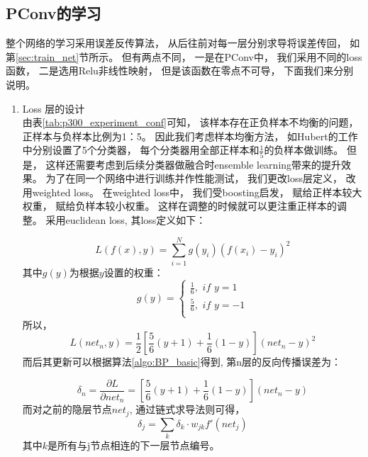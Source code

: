 \subsection{PConv的学习}\label{sec:weighted_loss}
整个网络的学习采用误差反传算法， 从后往前对每一层分别求导将误差传回， 如第\ref{sec:train_net}节所示。 但有两点不同， 一是在PConv中， 我们采用不同的loss函数， 二是选用Relu非线性映射， 但是该函数在零点不可导， 下面我们来分别说明。 
\begin{enumerate}
	\item Loss 层的设计\\
		由表\ref{tab:p300_experiment_conf}可知， 该样本存在正负样本不均衡的问题， 正样本与负样本比例为1：5。 因此我们考虑样本均衡方法， 如Hubert的工作中分别设置了5个分类器， 每个分类器用全部正样本和$\frac{1}{5}$的负样本做训练。 但是， 这样还需要考虑到后续分类器做融合时ensemble learning带来的提升效果。 为了在同一个网络中进行训练并作性能测试， 我们更改loss层定义， 改用weighted loss。 
		在weighted loss中， 我们受boosting启发\cite{}， 赋给正样本较大权重， 赋给负样本较小权重。 这样在调整的时候就可以更注重正样本的调整。 采用euclidean loss, 其loss定义如下：

\begin{equation}
	L(f(x),y) = \sum_{i=1}^N {g(y_i)(f(x_i) - y_i)^2}
\end{equation}
其中$g(y)$为根据$y$设置的权重：
\begin{equation*}
  g(y)=\left\{
    \begin{array}{lr}
        \frac{1}{6}, \,\, if\,\, y=1\\
        \frac{5}{6}, \,\, if\,\, y=-1\\
    \end{array}
  \right.
\end{equation*}
所以， 
\begin{equation}
	L(net_n,y) = \frac{1}{2}[\frac{5}{6}(y+1) + \frac{1}{6}(1-y)](net_n-y)^2
\end{equation}
	而后其更新可以根据算法\ref{algo:BP_basic}得到, 第n层的反向传播误差为：
	
\begin{equation}
	\delta_n = \frac{\partial L}{\partial net_n} = [\frac{5}{6}(y+1) + \frac{1}{6}(1-y)](net_n-y)
\end{equation}
	而对之前的隐层节点$net_j$, 通过链式求导法则可得，
\begin{equation}
	\delta_j = \sum_k{\delta_k\cdot w_{jk}f'(net_j)}
\end{equation}	
	其中$k$是所有与j节点相连的下一层节点编号。
	

\end{enumerate}
